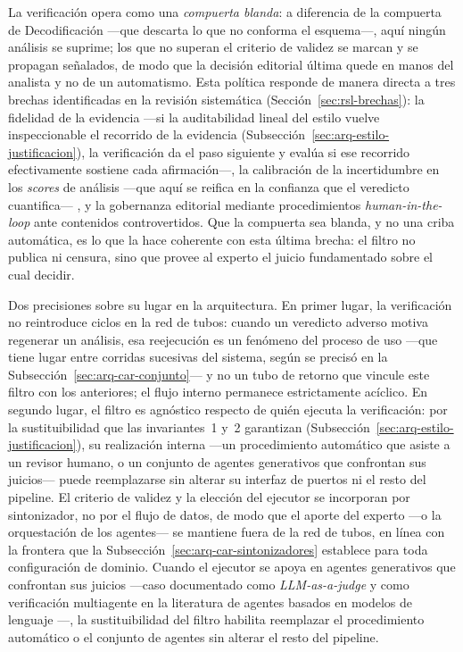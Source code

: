 \documentclass[12pt]{report}
\begin{document}
La verificación opera como una \textit{compuerta blanda}: a diferencia de la compuerta de Decodificación ---que descarta lo que no conforma el esquema---, aquí ningún análisis se suprime; los que no superan el criterio de validez se marcan y se propagan señalados, de modo que la decisión editorial última quede en manos del analista y no de un automatismo. Esta política responde de manera directa a tres brechas identificadas en la revisión sistemática (Sección~\ref{sec:rsl-brechas}): la fidelidad de la evidencia ---si la auditabilidad lineal del estilo vuelve inspeccionable el recorrido de la evidencia (Subsección~\ref{sec:arq-estilo-justificacion}), la verificación da el paso siguiente y evalúa si ese recorrido efectivamente sostiene cada afirmación---, la calibración de la incertidumbre en los \textit{scores} de análisis ---que aquí se reifica en la confianza que el veredicto cuantifica--- \citep{pavlyshenko2024}, y la gobernanza editorial mediante procedimientos \textit{human-in-the-loop} ante contenidos controvertidos. Que la compuerta sea blanda, y no una criba automática, es lo que la hace coherente con esta última brecha: el filtro no publica ni censura, sino que provee al experto el juicio fundamentado sobre el cual decidir.

Dos precisiones sobre su lugar en la arquitectura. En primer lugar, la verificación no reintroduce ciclos en la red de tubos: cuando un veredicto adverso motiva regenerar un análisis, esa reejecución es un fenómeno del proceso de uso ---que tiene lugar entre corridas sucesivas del sistema, según se precisó en la Subsección~\ref{sec:arq-car-conjunto}--- y no un tubo de retorno que vincule este filtro con los anteriores; el flujo interno permanece estrictamente acíclico. En segundo lugar, el filtro es agnóstico respecto de quién ejecuta la verificación: por la sustituibilidad que las invariantes~1 y~2 garantizan (Subsección~\ref{sec:arq-estilo-justificacion}), su realización interna ---un procedimiento automático que asiste a un revisor humano, o un conjunto de agentes generativos que confrontan sus juicios--- puede reemplazarse sin alterar su interfaz de puertos ni el resto del pipeline.
El criterio de validez y la elección del ejecutor se incorporan por sintonizador, no por el flujo de datos, de modo que el aporte del experto ---o la orquestación de los agentes--- se mantiene fuera de la red de tubos, en línea con la frontera que la Subsección~\ref{sec:arq-car-sintonizadores} establece para toda configuración de dominio. Cuando el ejecutor se apoya en agentes generativos que confrontan sus juicios ---caso documentado como \textit{LLM-as-a-judge} \citep{zheng:2023} y como verificación multiagente en la literatura de agentes basados en modelos de lenguaje \citep{xi:2023}---, la sustituibilidad del filtro habilita reemplazar el procedimiento automático o el conjunto de agentes sin alterar el resto del pipeline.
\end{document}
